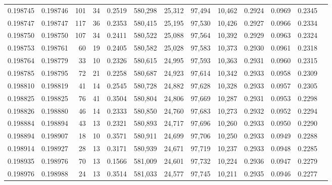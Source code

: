 \begin{tabular}{rrrrrrrrrrrrr}
0.198745 & 0.198746 &   101 &  34 &                                     0.2519 & 580,298 &  25,312 &  97,494 &  10,462 & 0.2924 & 0.0969 & 0.2345 \\
0.198747 & 0.198747 &   117 &  36 &                                     0.2353 & 580,415 &  25,195 &  97,530 &  10,426 & 0.2927 & 0.0966 & 0.2334 \\
0.198750 & 0.198750 &   107 &  34 &                                     0.2411 & 580,522 &  25,088 &  97,564 &  10,392 & 0.2929 & 0.0963 & 0.2324 \\
0.198753 & 0.198761 &    60 &  19 &                                     0.2405 & 580,582 &  25,028 &  97,583 &  10,373 & 0.2930 & 0.0961 & 0.2318 \\
0.198764 & 0.198779 &    33 &  10 &                                     0.2326 & 580,615 &  24,995 &  97,593 &  10,363 & 0.2931 & 0.0960 & 0.2315 \\
0.198785 & 0.198795 &    72 &  21 &                                     0.2258 & 580,687 &  24,923 &  97,614 &  10,342 & 0.2933 & 0.0958 & 0.2309 \\
0.198810 & 0.198819 &    41 &  14 &                                     0.2545 & 580,728 &  24,882 &  97,628 &  10,328 & 0.2933 & 0.0957 & 0.2305 \\
0.198825 & 0.198825 &    76 &  41 &                                     0.3504 & 580,804 &  24,806 &  97,669 &  10,287 & 0.2931 & 0.0953 & 0.2298 \\
0.198826 & 0.198880 &    46 &  14 &                                     0.2333 & 580,850 &  24,760 &  97,683 &  10,273 & 0.2932 & 0.0952 & 0.2294 \\
0.198884 & 0.198894 &    43 &  13 &                                     0.2321 & 580,893 &  24,717 &  97,696 &  10,260 & 0.2933 & 0.0950 & 0.2290 \\
0.198894 & 0.198907 &    18 &  10 &                                     0.3571 & 580,911 &  24,699 &  97,706 &  10,250 & 0.2933 & 0.0949 & 0.2288 \\
0.198914 & 0.198927 &    28 &  13 &                                     0.3171 & 580,939 &  24,671 &  97,719 &  10,237 & 0.2933 & 0.0948 & 0.2285 \\
0.198935 & 0.198976 &    70 &  13 &                                     0.1566 & 581,009 &  24,601 &  97,732 &  10,224 & 0.2936 & 0.0947 & 0.2279 \\
0.198976 & 0.198988 &    24 &  13 &                                     0.3514 & 581,033 &  24,577 &  97,745 &  10,211 & 0.2935 & 0.0946 & 0.2277 \\

\end{tabular}
